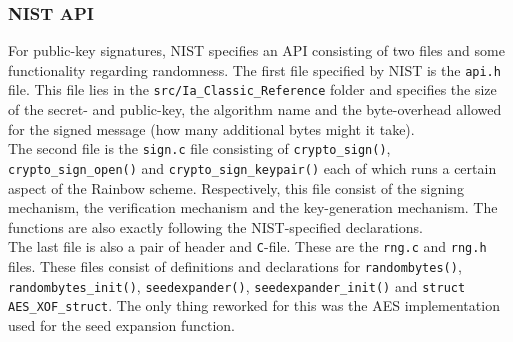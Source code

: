 \subsubsection{NIST API}
For public-key signatures, NIST specifies an API consisting of two files and some functionality regarding randomness. The first file specified by NIST is the \texttt{api.h} file. This file lies in the \texttt{src/Ia\_Classic\_Reference} folder and specifies the size of the secret- and public-key, the algorithm name and the byte-overhead allowed for the signed message (how many additional bytes might it take).
\medskip\\
The second file is the \texttt{sign.c} file consisting of \texttt{crypto\_sign()}, \texttt{crypto\_sign\_open()} and \texttt{crypto\_sign\_keypair()} each of which runs a certain aspect of the Rainbow scheme. Respectively, this file consist of the signing mechanism, the verification mechanism and the key-generation mechanism. The functions are also exactly following the NIST-specified declarations.
\medskip\\
The last file is also a pair of header and \texttt{C}-file. These are the \texttt{rng.c} and \texttt{rng.h} files. These files consist of definitions and declarations for \texttt{randombytes()}, \texttt{randombytes\_init()}, \texttt{seedexpander()}, \texttt{seedexpander\_init()} and \texttt{struct AES\_XOF\_struct}. The only thing reworked for this was the AES implementation used for the seed expansion function.
